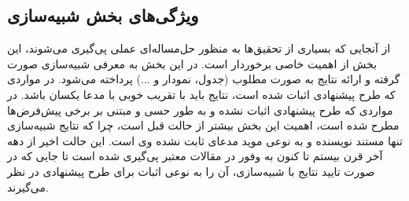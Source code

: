 \documentclass{CSICC2016}
\begin{document}
\subsection{ویژگی‌های بخش شبیه‌سازی}
\label{Sec:ExperimentalResults}

از آنجایی که بسیاری از تحقیق‌ها به منظور حل‌مساله‌ای عملی پی‌گیری می‌شوند، این بخش از اهمیت خاصی برخوردار است. در این بخش به معرفی شبیه‌سازی صورت گرفته و ارائه نتایج به صورت مطلوب (جدول، نمودار و ...) پرداخته می‌شود. در مواردی که طرح پیشنهادی اثبات شده است، نتایج باید با تقریب خوبی با مدعا یکسان باشد. در مواردی که طرح پیشنهادی اثبات نشده و به طور حسی و مبتنی بر برخی پیش‌فرض‌ها مطرح شده است،  اهمیت این بخش بیشتر از حالت قبل است، چرا که نتایج شبیه‌سازی تنها مستند نویسنده و به نوعی موید مدعای ثابت نشده وی است. این حالت اخیر از دهه آخر قرن بیستم تا کنون به وفور در مقالات معتبر پی‌گیری شده است تا جایی که در صورت تایید نتایج با شبیه‌سازی، آن را به نوعی اثبات برای طرح پیشنهادی در نظر می‌گیرند.
\end{document}
